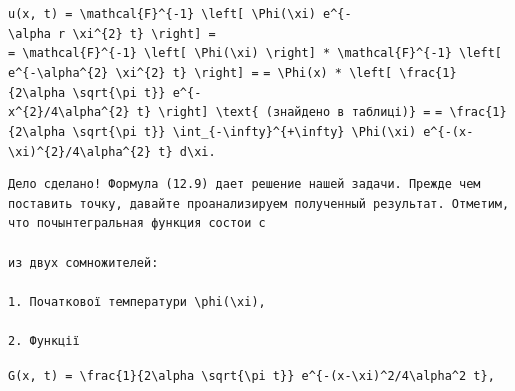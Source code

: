 \documentclass[
  ukrainian,
]{article}
\begin{document}
\texttt{u(x,\ t)\ =\ \textbackslash{}mathcal\{F\}\^{}\{-1\}\ \textbackslash{}left{[}\ \textbackslash{}Phi(\textbackslash{}xi)\ e\^{}\{-\textbackslash{}alpha\ r\ \textbackslash{}xi\^{}\{2\}\ t\}\ \textbackslash{}right{]}\ =}
\texttt{=\ \textbackslash{}mathcal\{F\}\^{}\{-1\}\ \textbackslash{}left{[}\ \textbackslash{}Phi(\textbackslash{}xi)\ \textbackslash{}right{]}\ *\ \textbackslash{}mathcal\{F\}\^{}\{-1\}\ \textbackslash{}left{[}\ e\^{}\{-\textbackslash{}alpha\^{}\{2\}\ \textbackslash{}xi\^{}\{2\}\ t\}\ \textbackslash{}right{]}\ =}
\texttt{=\ \textbackslash{}Phi(x)\ *\ \textbackslash{}left{[}\ \textbackslash{}frac\{1\}\{2\textbackslash{}alpha\ \textbackslash{}sqrt\{\textbackslash{}pi\ t\}\}\ e\^{}\{-x\^{}\{2\}/4\textbackslash{}alpha\^{}\{2\}\ t\}\ \textbackslash{}right{]}\ \textbackslash{}text\{\ (знайдено\ в\ таблиці)\}\ =}
\texttt{=\ \textbackslash{}frac\{1\}\{2\textbackslash{}alpha\ \textbackslash{}sqrt\{\textbackslash{}pi\ t\}\}\ \textbackslash{}int\_\{-\textbackslash{}infty\}\^{}\{+\textbackslash{}infty\}\ \textbackslash{}Phi(\textbackslash{}xi)\ e\^{}\{-(x-\textbackslash{}xi)\^{}\{2\}/4\textbackslash{}alpha\^{}\{2\}\ t\}\ d\textbackslash{}xi.}

\begin{verbatim}
Дело сделано! Формула (12.9) дает решение нашей задачи. Прежде чем поставить точку, давайте проанализируем полученный результат. Отметим, что почынтегральная функция состои с

из двух сомножителей:

1. Початкової температури \phi(\xi),

2. Функції
\end{verbatim}

\texttt{G(x,\ t)\ =\ \textbackslash{}frac\{1\}\{2\textbackslash{}alpha\ \textbackslash{}sqrt\{\textbackslash{}pi\ t\}\}\ e\^{}\{-(x-\textbackslash{}xi)\^{}2/4\textbackslash{}alpha\^{}2\ t\},}
\end{document}
